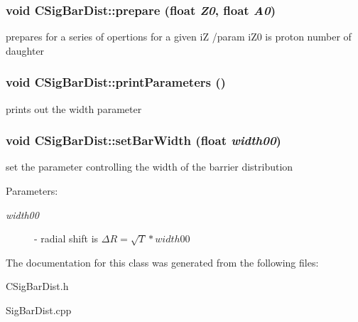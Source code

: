 \subsubsection{\setlength{\rightskip}{0pt plus 5cm}void CSig\-Bar\-Dist::prepare (float {\em Z0}, float {\em A0})}\label{classCSigBarDist_d81bc66a58512cd7ab23bf10fc4ce7ca}


prepares for a series of opertions for a given i\-Z /param i\-Z0 is proton number of daughter 
\subsubsection{\setlength{\rightskip}{0pt plus 5cm}void CSig\-Bar\-Dist::print\-Parameters ()\hspace{0.3cm}{\tt  [static]}}\label{classCSigBarDist_18a63652d6600aae4ede085dcaf522f9}


prints out the width parameter 
\subsubsection{\setlength{\rightskip}{0pt plus 5cm}void CSig\-Bar\-Dist::set\-Bar\-Width (float {\em width00})\hspace{0.3cm}{\tt  [static]}}\label{classCSigBarDist_c2d8d22c9bf77a1988fa934201a40fd5}


set the parameter controlling the width of the barrier distribution \begin{Desc}
\item[Parameters:]
\begin{description}
\item[{\em width00}]- radial shift is $ \Delta R= \sqrt T* width00 $ \end{description}
\end{Desc}


The documentation for this class was generated from the following files:\begin{CompactItemize}
\item 
CSig\-Bar\-Dist.h\item 
Sig\-Bar\-Dist.cpp\end{CompactItemize}
